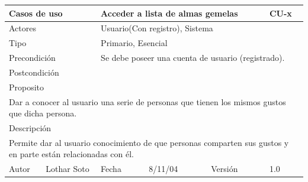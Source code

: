 \documentclass{article}
\begin{document}
\begin{table}[h]
\begin{tabular}{|l|l|l|l|l|l|}
\hline
\multicolumn{2}{|p{2cm}|}{Casos de uso}  & \multicolumn{3}{p{7cm}|}{Acceder a lista de almas gemelas} & CU-x \\
\hline
\multicolumn{2}{|p{2cm}|}{Actores}       & \multicolumn{4}{p{8cm}|}{Usuario(Con registro), Sistema}        \\
\hline
\multicolumn{2}{|p{2cm}|}{Tipo}          & \multicolumn{4}{p{8cm}|}{Primario, Esencial}        \\
\hline
\multicolumn{2}{|p{2cm}|}{Precondición}  & \multicolumn{4}{p{8cm}|}{Se debe poseer una cuenta de usuario (registrado).}        \\
\hline
\multicolumn{2}{|p{2cm}|}{Postcondición} & \multicolumn{4}{p{8cm}|}{}        \\
\hline
\multicolumn{6}{|p{10cm}|}{Proposito}                                   \\
\hline
\multicolumn{6}{|p{10cm}|}{Dar a conocer al usuario una serie de personas que tienen los mismos gustos que dicha persona.}                                            \\
\hline
\multicolumn{6}{|p{10cm}|}{Descripción}                                 \\
\hline
\multicolumn{6}{|p{10cm}|}{Permite dar al usuario conocimiento de que personas comparten sus gustos y en parte están relacionadas con él.}                                            \\
\hline
Autor          &       Lothar Soto        & Fecha    &  8/11/04   &   Versión  & 1.0\\    
\hline
\end{tabular}
\end{table}
\end{document}
